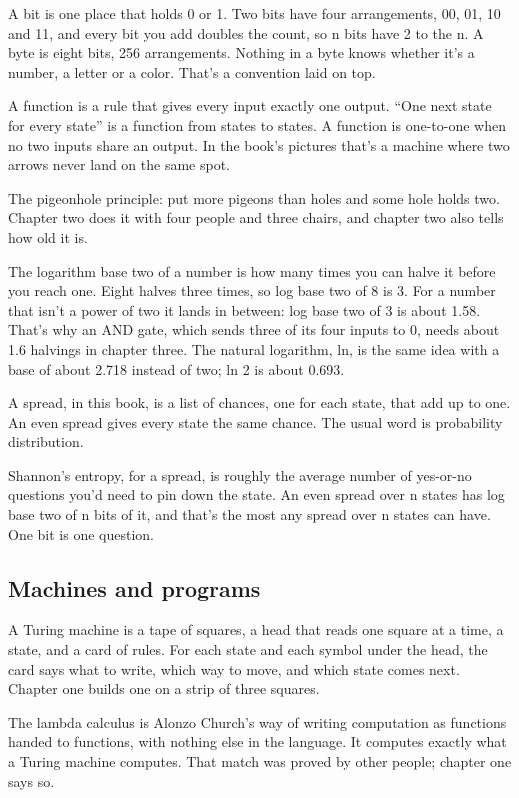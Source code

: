 \documentclass[11pt,twoside]{article}
\theoremstyle{thielethm}
\theoremstyle{thieledef}
\theoremstyle{thieledef}
\theoremstyle{thieledef}
\theoremstyle{thielethm}
\theoremstyle{thieleobs}
\theoremstyle{thielethm}
\begin{document}
A bit is one place that holds 0 or 1. Two bits have four arrangements, 00, 01, 10 and 11, and every bit you add doubles the count, so n bits have 2 to the n. A byte is eight bits, 256 arrangements. Nothing in a byte knows whether it's a number, a letter or a color. That's a convention laid on top.

A function is a rule that gives every input exactly one output. ``One next state for every state'' is a function from states to states. A function is one-to-one when no two inputs share an output. In the book's pictures that's a machine where two arrows never land on the same spot.

The pigeonhole principle: put more pigeons than holes and some hole holds two. Chapter two does it with four people and three chairs, and chapter two also tells how old it is.

The logarithm base two of a number is how many times you can halve it before you reach one. Eight halves three times, so log base two of 8 is 3. For a number that isn't a power of two it lands in between: log base two of 3 is about 1.58. That's why an AND gate, which sends three of its four inputs to 0, needs about 1.6 halvings in chapter three. The natural logarithm, ln, is the same idea with a base of about 2.718 instead of two; ln 2 is about 0.693.

A spread, in this book, is a list of chances, one for each state, that add up to one. An even spread gives every state the same chance. The usual word is probability distribution.

Shannon's entropy, for a spread, is roughly the average number of yes-or-no questions you'd need to pin down the state. An even spread over n states has log base two of n bits of it, and that's the most any spread over n states can have. One bit is one question.

\subsection{Machines and programs}

A Turing machine is a tape of squares, a head that reads one square at a time, a state, and a card of rules. For each state and each symbol under the head, the card says what to write, which way to move, and which state comes next. Chapter one builds one on a strip of three squares.

The lambda calculus is Alonzo Church's way of writing computation as functions handed to functions, with nothing else in the language. It computes exactly what a Turing machine computes. That match was proved by other people; chapter one says so.
\end{document}

